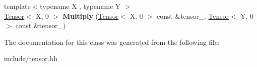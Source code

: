 \begin{DoxyCompactItemize}
\item 
{\footnotesize template$<$typename X , typename Y $>$ }\\\hyperlink{classtensor_1_1Tensor}{Tensor}$<$ X, 0 $>$ {\bfseries Multiply} (\hyperlink{classtensor_1_1Tensor}{Tensor}$<$ X, 0 $>$ const \&tensor\+\_, \hyperlink{classtensor_1_1Tensor}{Tensor}$<$ Y, 0 $>$ const \&tensor\+\_)\hypertarget{classtensor_1_1Tensor_3_01T_00_010_01_4_aa842e0c0365709ae8867db4f266c8934}{}\label{classtensor_1_1Tensor_3_01T_00_010_01_4_aa842e0c0365709ae8867db4f266c8934}

\end{DoxyCompactItemize}


The documentation for this class was generated from the following file\+:\begin{DoxyCompactItemize}
\item 
include/tensor.\+hh\end{DoxyCompactItemize}
